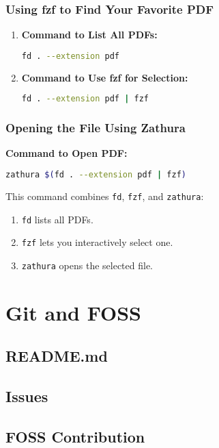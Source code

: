 \documentclass{article}
\begin{document}
\subsubsection{Using fzf to Find Your Favorite PDF}
\begin{enumerate}
  \item \textbf{Command to List All PDFs:}
  \begin{lstlisting}[language=bash]
  fd . --extension pdf
  \end{lstlisting}

  \item \textbf{Command to Use fzf for Selection:}
  \begin{lstlisting}[language=bash]
  fd . --extension pdf | fzf
  \end{lstlisting}
\end{enumerate}

\subsubsection{Opening the File Using Zathura}
\textbf{Command to Open PDF:}
\begin{lstlisting}[language=bash]
zathura $(fd . --extension pdf | fzf)
\end{lstlisting}
This command combines \texttt{fd}, \texttt{fzf}, and \texttt{zathura}:
\begin{enumerate}
    \item \texttt{fd} lists all PDFs.
    \item \texttt{fzf} lets you interactively select one.
    \item \texttt{zathura} opens the selected file.
\end{enumerate}

\newpage

\section{Git and FOSS}
\subsection{README.md}

\subsection{Issues}

\subsection{FOSS Contribution}
\end{document}
